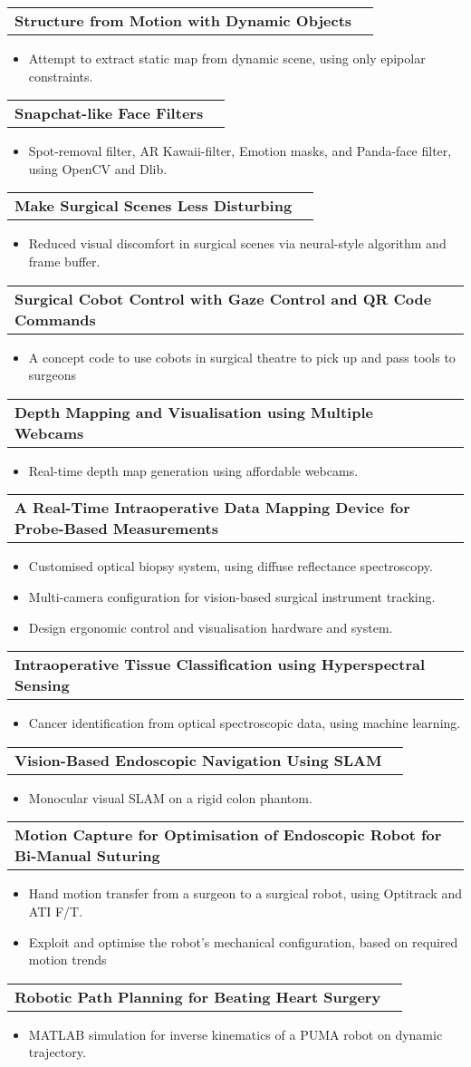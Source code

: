 \documentclass[letterpaper,11pt]{article}
\makeatletter
\newcommand{\resumeItem}[1]{
  \item\small{
    {#1 \vspace{-2pt}}
  }
}
\newcommand{\resumeProject}[1]{
  \vspace{-1pt}\item
    \begin{tabular*}{0.97\textwidth}[t]{l@{\extracolsep{\fill}}r}
      \textbf{#1} \\
    \end{tabular*}\vspace{-5pt}
}
\newcommand{\resumeItemListStart}{\begin{itemize}}
\newcommand{\resumeItemListEnd}{\end{itemize}\vspace{-5pt}}
\makeatother
\begin{document}
    \resumeProject
      {Structure from Motion with Dynamic Objects}
      \resumeItemListStart
        \resumeItem {Attempt to extract static map from dynamic scene, using only epipolar constraints.}
      \resumeItemListEnd
    \resumeProject
      {Snapchat-like Face Filters}
      \resumeItemListStart
        \resumeItem {Spot-removal filter, AR Kawaii-filter, Emotion masks, and Panda-face filter, using OpenCV and Dlib.}
      \resumeItemListEnd
    \resumeProject
      {Make Surgical Scenes Less Disturbing}
      \resumeItemListStart
        \resumeItem {Reduced visual discomfort in surgical scenes via neural-style algorithm and frame buffer.}
      \resumeItemListEnd
    \resumeProject
      {Surgical Cobot Control with Gaze Control and QR Code Commands}
      \resumeItemListStart
        \resumeItem {A concept code to use cobots in surgical theatre to pick up and pass tools to surgeons}
      \resumeItemListEnd
    \resumeProject
      {Depth Mapping and Visualisation using Multiple Webcams}
      \resumeItemListStart
        \resumeItem {Real-time depth map generation using affordable webcams.}
      \resumeItemListEnd
    \resumeProject
      {A Real-Time Intraoperative Data Mapping Device for Probe-Based Measurements}
      \resumeItemListStart
        \resumeItem {Customised optical biopsy system, using diffuse reflectance spectroscopy.}
        \resumeItem {Multi-camera configuration for vision-based surgical instrument tracking.}
        \resumeItem {Design ergonomic control and visualisation hardware and system.}
      \resumeItemListEnd
    \resumeProject
      {Intraoperative Tissue Classification using Hyperspectral Sensing}
      \resumeItemListStart
        \resumeItem {Cancer identification from optical spectroscopic data, using machine learning.}
      \resumeItemListEnd
    \resumeProject
      {Vision-Based Endoscopic Navigation Using SLAM}
      \resumeItemListStart
        \resumeItem {Monocular visual SLAM on a rigid colon phantom.}
      \resumeItemListEnd
    \resumeProject
      {Motion Capture for Optimisation of Endoscopic Robot for Bi-Manual Suturing}
      \resumeItemListStart
        \resumeItem {Hand motion transfer from a surgeon to a surgical robot, using Optitrack and ATI F/T.}
        \resumeItem {Exploit and optimise the robot's mechanical configuration, based on required motion trends}
      \resumeItemListEnd
    \resumeProject
      {Robotic Path Planning for Beating Heart Surgery}
      \resumeItemListStart
        \resumeItem {MATLAB simulation for inverse kinematics of a PUMA robot on dynamic trajectory.}
      \resumeItemListEnd
\end{document}
